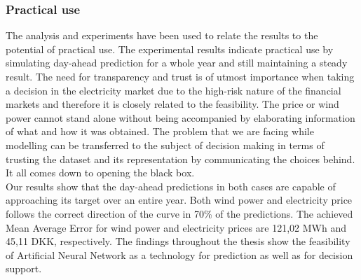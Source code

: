 \subsubsection{Practical use}
The analysis and experiments have been used to relate the results to the potential of practical use. The experimental results indicate practical use by simulating day-ahead prediction for a whole year and still maintaining a steady result. The need for transparency and trust is of utmost importance when taking a decision in the electricity market due to the high-risk nature of the financial markets and therefore it is closely related to the feasibility. The price or wind power cannot stand alone without being accompanied by elaborating information of what and how it was obtained. The problem that we are facing while modelling can be transferred to the subject of decision making in terms of trusting the dataset and its representation by communicating the choices behind. It all comes down to opening the black box.
\\[0.5cm]
Our results show that the day-ahead predictions in both cases are capable of approaching its target over an entire year. Both wind power and electricity price follows the correct direction of the curve in 70\% of the predictions. The achieved Mean Average Error for wind power and electricity prices are 121,02 MWh and 45,11 DKK, respectively. The findings throughout the thesis show the feasibility of Artificial Neural Network as a technology for prediction as well as for decision support.  
